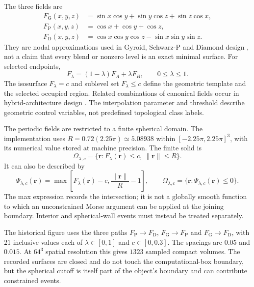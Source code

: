 The three fields are
\begin{equation}
\begin{aligned}
F_{\mathrm G}(x,y,z)&=\sin x\cos y+\sin y\cos z+\sin z\cos x,\\
F_{\mathrm P}(x,y,z)&=\cos x+\cos y+\cos z,\\
F_{\mathrm D}(x,y,z)&=\cos x\cos y\cos z-\sin x\sin y\sin z.
\end{aligned}
\label{suppeq:tpms_fields}
\end{equation}
They are nodal approximations used in Gyroid, Schwarz-P and Diamond design \cite{kg_gado2024tpms}, not a claim that every blend or nonzero level is an exact minimal surface. For selected endpoints,
\begin{equation}
F_\lambda=(1-\lambda)F_A+\lambda F_B,\qquad0\leq\lambda\leq1.
\label{suppeq:tpms_interpolation}
\end{equation}
The isosurface $F_\lambda=c$ and sublevel set $F_\lambda\leq c$ define the geometric template and the selected occupied region. Related combinations of canonical fields occur in hybrid-architecture design \cite{kg_mele2025hybrid_tpms}. The interpolation parameter and threshold describe geometric control variables, not predefined topological class labels.

The periodic fields are restricted to a finite spherical domain. The implementation uses $R=0.72(2.25\pi)\simeq5.08938$ within $[-2.25\pi,2.25\pi]^3$, with its numerical value stored at machine precision. The finite solid is
\begin{equation}
\Omega_{\lambda,c}=\{\mathbf r:F_\lambda(\mathbf r)\leq c,\ \|\mathbf r\|\leq R\}.
\label{suppeq:tpms_compact_solid}
\end{equation}
It can also be described by
\begin{equation}
\Psi_{\lambda,c}(\mathbf r)=\max\!\left[F_\lambda(\mathbf r)-c,\frac{\|\mathbf r\|}{R}-1\right],
\qquad\Omega_{\lambda,c}=\{\mathbf r:\Psi_{\lambda,c}(\mathbf r)\leq0\}.
\end{equation}
The max expression records the intersection; it is not a globally smooth function to which an unconstrained Morse argument can be applied at the joining boundary. Interior and spherical-wall events must instead be treated separately.

The historical figure uses the three paths $F_{\mathrm P}\to F_{\mathrm D}$, $F_{\mathrm G}\to F_{\mathrm P}$ and $F_{\mathrm G}\to F_{\mathrm D}$, with $21$ inclusive values each of $\lambda\in[0,1]$ and $c\in[0,0.3]$. The spacings are $0.05$ and $0.015$. At $64^3$ spatial resolution this gives $1323$ sampled compact volumes. The recorded surfaces are closed and do not touch the computational-box boundary, but the spherical cutoff is itself part of the object's boundary and can contribute constrained events.

